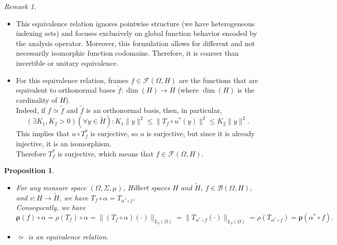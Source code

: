 \documentclass[a4paper,10pt]{article}
\theoremstyle{plain}
\newtheorem{proposition}[theorem]{Proposition}
\theoremstyle{definition}
\theoremstyle{remark}
\newtheorem{remark}[theorem]{Remark}
\begin{document}
\begin{remark}
  \mbox{} \\
  \begin{itemize}
    \item This equivalence relation ignores pointwise structure (we have heterogeneous indexing sets) and focuses exclusively on global function behavior encoded by the analysis operator. Moreover, this formulation allows for different and not necessarily isomorphic function codomains.  Therefore, it is coarser than invertible or unitary equivalence.
    \item For this equivalence relation, frames $f \in \mathsf{\mathcal{F}}(\Omega,H)$ are the functions that are equivalent to orthonormal bases $\tilde{f} : \operatorname{dim}(H) \to H$ (where $\operatorname{dim}(H)$ is the cardinality of $H$). \\
          Indeed, if $f \simeq \tilde{f}$ and $\tilde{f}$ is an orthonormal basis, then, in particular,
          \[ (\exists K_1,K_2 > 0)(\forall y \in \tilde{H}) : K_1  \lVert y \rVert^2 \leq \lVert T_f \circ u^*(y) \rVert^2 \leq K_2 \lVert y \rVert^2. \]
          This implies that $u \circ T_f^*$ is surjective, so $u$ is surjective, but since it is already injective, it is an isomorphism. \\
          Therefore $T_f^*$ is surjective, which means that $f \in \mathsf{\mathcal{F}}(\Omega,H)$.
  \end{itemize}
\end{remark}

\begin{proposition}
  \mbox{} \\
  \begin{itemize}
    \item For any measure space $(\Omega ,\Sigma,\mu)$, Hilbert spaces $H$ and $\tilde{H}$, $f \in \mathsf{\mathcal{B}}(\Omega,H)$, and $v : H \to \tilde{H}$, we have $T_f \circ \alpha = T_{\alpha^* \circ f}$. \\
          Consequently, we have
          \[ \boldsymbol{\rho}(f) \circ \alpha = \rho(T_f) \circ \alpha = \|(T_f \circ \alpha)(\cdot) \|_{L_2(\Omega)} = \|T_{\alpha^* \circ f}(\cdot) \|_{L_2(\Omega)} =\rho(T_{\alpha^* \circ f}) = \boldsymbol{\rho}(\alpha^* \circ f). \]
    \item $\simeq$ is an equivalence relation.
  \end{itemize}
\end{proposition}
\end{document}
